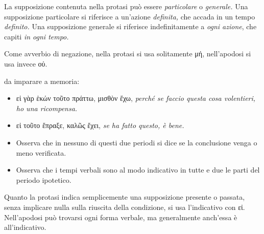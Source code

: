 \documentclass[nols]{tufte-handout}
\newcommand{\didobf}[1]{{\GFSDidotBf #1}}
\newcommand{\textls}[2][5]{%
    \begingroup\addfontfeatures{LetterSpace=#1}#2\endgroup
  }
\renewcommand{\smallcapsspacing}[1]{\textls[10]{#1}}
\renewcommand{\textsc}[1]{\smallcapsspacing{\textsmallcaps{#1}}}
\begin{document}
 La supposizione contenuta nella protasi può essere \textit{particolare} o \textit{generale.} 
Una supposizione particolare si riferisce a un'azione \textit{definita,} che accada in un tempo \textit{definito.}
Una supposizione generale si riferisce indefinitamente a \textit{ogni azione}, che capiti \textit{in ogni tempo.}

 Come avverbio di negazione, nella protasi si usa solitamente \didobf{μή}, nell'apodosi si usa invece \didobf{οὐ}. 


 da imparare a memoria:
\begin{itemize}
\item[\textsc{a.}] \didobf{εἰ γὰρ ἑκών τοῦτο πράττω, μισθὸν ἕχω}, \textit{perché se faccio questa cosa volentieri, ho una ricompensa.}
\item[\textsc{b.}] \didobf{εἰ τοῦτο ἔπραξε, καλῶς ἔχει}, \textit{se ha fatto questo, è bene.}
\item[\textsc{1.}] Osserva che in nessuno di questi due periodi si dice se la conclusione venga o meno verificata.
\item[\textsc{2.}] Osserva che i tempi verbali sono al modo indicativo in tutte e due le parti del periodo ipotetico.
\end{itemize} 

 Quanto la protasi indica semplicemente una supposizione presente o passata, senza implicare nulla sulla riuscita
della condizione, si usa l'indicativo con \didobf{εἰ}. Nell'apodosi può trovarsi ogni forma verbale, ma generalmente anch'essa è all'indicativo. 


\end{document}
